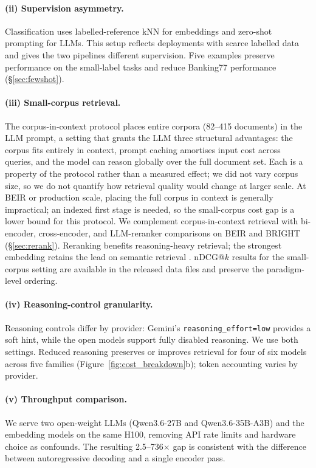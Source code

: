 \paragraph{(ii) Supervision asymmetry.}
Classification uses labelled-reference kNN for embeddings and zero-shot prompting for LLMs.
This setup reflects deployments with scarce labelled data and gives the two pipelines different supervision. Five examples preserve performance on the small-label tasks and reduce Banking77 performance (\S\ref{sec:fewshot}).

\paragraph{(iii) Small-corpus retrieval.}
The corpus-in-context protocol places entire corpora (82--415 documents) in the LLM prompt, a setting that grants the LLM three structural advantages: the corpus fits entirely in context, prompt caching amortises input cost across queries, and the model can reason globally over the full document set.
Each is a property of the protocol rather than a measured effect; we did not vary corpus size, so we do not quantify how retrieval quality would change at larger scale.
At BEIR or production scale, placing the full corpus in context is generally impractical; an indexed first stage is needed, so the small-corpus cost gap is a lower bound for this protocol.
We complement corpus-in-context retrieval with bi-encoder, cross-encoder, and LLM-reranker comparisons on BEIR and BRIGHT (\S\ref{sec:rerank}). Reranking benefits reasoning-heavy retrieval; the strongest embedding retains the lead on semantic retrieval \citep{sun2023rankgpt,weller2025rank1testtimecomputereranking}.
nDCG@$k$ results for the small-corpus setting are available in the released data files and preserve the paradigm-level ordering.

\paragraph{(iv) Reasoning-control granularity.}
Reasoning controls differ by provider: Gemini's \texttt{reasoning\_effort=low} provides a soft hint, while the open models support fully disabled reasoning.
We use both settings. Reduced reasoning preserves or improves retrieval for four of six models across five families (Figure~\ref{fig:cost_breakdown}b); token accounting varies by provider.

\paragraph{(v) Throughput comparison.}
We serve two open-weight LLMs (Qwen3.6-27B and Qwen3.6-35B-A3B) and the embedding models on the same H100, removing API rate limits and hardware choice as confounds.
The resulting 2.5--736$\times$ gap is consistent with the difference between autoregressive decoding and a single encoder pass.

